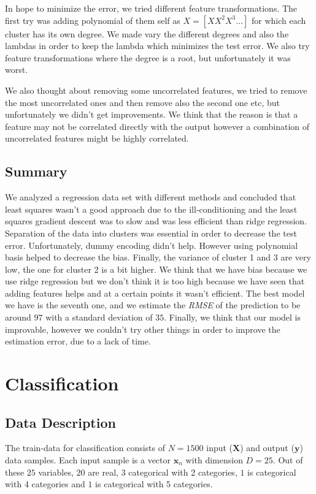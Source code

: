 \documentclass{article} %
\begin{document}
In hope to minimize the error, we tried different feature transformations. The first try was adding polynomial of them self as $X = [X X^2 X^3 ...]$ for which each cluster has its own degree. We made vary the different degrees and also the lambdas in order to keep the lambda which minimizes the test error. We also try feature transformations where the degree is a root, but unfortunately it was worst.

We also thought about removing some uncorrelated features, we tried to remove the most uncorrelated ones and then remove also the second one etc, but unfortunately we didn't get improvements. We think that the reason is that a feature may not be correlated directly with the output however a combination of uncorrelated features might be highly correlated. 

\subsection{Summary}

We analyzed a regression data set with different methods and concluded that least squares wasn't a good approach due to the ill-conditioning and the least squares gradient descent was to slow and was less efficient than ridge regression. Separation of the data into clusters was essential in order to decrease the test error. Unfortunately, dummy encoding didn't help. However using polynomial basis helped to decrease the bias. Finally, the variance of cluster 1 and 3 are very low, the one for cluster 2 is a bit higher. We think that we have bias because we use ridge regression but we don't think it is too high because we have seen that adding features helps and at a certain points it wasn't efficient. The best model we have is the seventh one, and we estimate the \textit{RMSE} of the prediction to be around $97$ with a standard deviation of $35$. Finally, we think that our model is improvable, however we couldn't try other things in order to improve the estimation error, due to a lack of time.

\section{Classification}

\subsection{Data Description}

The train-data for classification consists of $N = 1500$ input ($\mathbf{X}$) and output ($\mathbf{y}$) data samples. Each input sample is a vector $\mathbf{x}_n$ with dimension $D = 25$. Out of these $25$ variables, $20$ are real, $3$ categorical with 2 categories, $1$ is categorical with 4 categories and $1$ is categorical with 5 categories.
\end{document}
